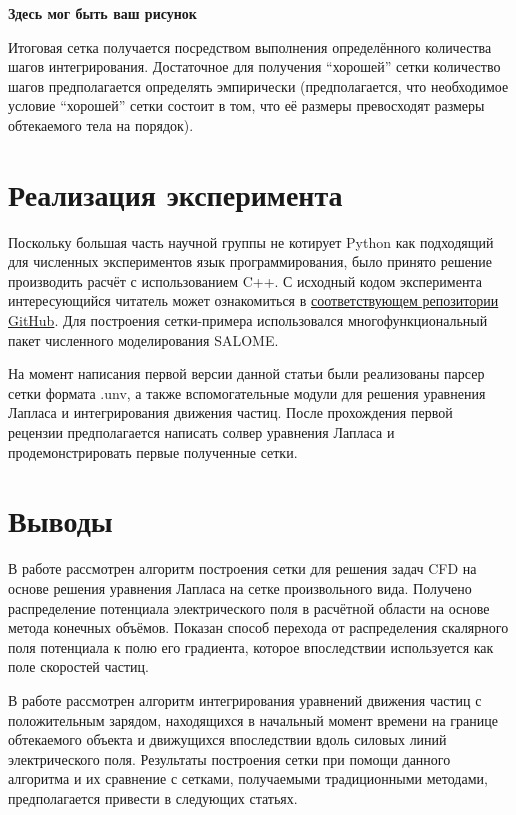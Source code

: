 \documentclass[a4paper,12pt]{article}
\begin{document}
\textbf{Здесь мог быть ваш рисунок}

Итоговая сетка получается посредством выполнения определённого количества шагов интегрирования. Достаточное для получения “хорошей” сетки количество шагов предполагается определять эмпирически (предполагается, что необходимое условие “хорошей” сетки состоит в том, что её размеры превосходят размеры обтекаемого тела на порядок).

\section{Реализация эксперимента}

Поскольку большая часть научной группы не котирует Python как подходящий для численных экспериментов язык программирования, было принято решение производить расчёт с использованием C++. С исходный кодом эксперимента интересующийся читатель может ознакомиться в \href{https://github.com/d-qql/FlowMeshBuilder}{соответствующем репозитории GitHub}. Для построения сетки-примера использовался многофункциональный пакет численного моделирования SALOME.

На момент написания первой версии данной статьи были реализованы парсер сетки формата .unv, а также вспомогательные модули для решения уравнения Лапласа и интегрирования движения частиц. После прохождения первой рецензии предполагается написать солвер уравнения Лапласа и продемонстрировать первые полученные сетки.

\section{Выводы}

В работе рассмотрен алгоритм построения сетки для решения задач CFD на основе  решения уравнения Лапласа на сетке произвольного вида. Получено распределение потенциала электрического поля в расчётной области на основе метода конечных объёмов. Показан способ перехода от распределения скалярного поля потенциала к полю его градиента, которое впоследствии используется как поле скоростей частиц.

В работе рассмотрен алгоритм интегрирования уравнений движения частиц с положительным зарядом, находящихся в начальный момент времени на границе обтекаемого объекта и движущихся впоследствии вдоль силовых линий электрического поля. Результаты построения сетки при помощи данного алгоритма и их сравнение с сетками, получаемыми традиционными методами, предполагается привести в следующих статьях.
\end{document}
